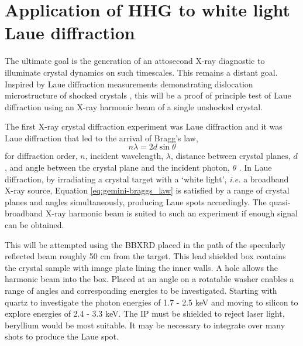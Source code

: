  

\section{Application of HHG to white light Laue diffraction}
The ultimate goal is the generation of an attosecond X-ray diagnostic to illuminate crystal dynamics on such timescales. This remains a distant goal. Inspired by Laue diffraction measurements demonstrating dislocation microstructure of shocked crystals \cite{suggitNanosecondWhitelightLaue2012}, this will be a proof of principle test of Laue diffraction using an X-ray harmonic beam of a single unshocked crystal.

The first X-ray crystal diffraction experiment was Laue diffraction and it was Laue diffraction that led to the arrival of Bragg's law,
\begin{equation}\label{eq:gemini-braggs_law}
	n\lambda = 2d\sin\theta
\end{equation}
for diffraction order, $n$, incident wavelength, $\lambda$, distance between crystal planes, $d$, and angle between the crystal plane and the incident photon, $\theta$ \cite{braggDiffractionWaves1915}. In Laue diffraction, by irradiating a crystal target with a `white light', \textit{i.e. } a broadband X-ray source, Equation \ref{eq:gemini-braggs_law} is satisfied by a range of crystal planes and angles simultaneously, producing Laue spots accordingly. The quasi-broadband X-ray harmonic beam is suited to such an experiment if enough signal can be obtained.

This will be attempted using the \ac{BBXRD} placed in the path of the specularly reflected beam roughly 50 cm from the target. This lead shielded box contains the crystal sample with image plate lining the inner walls. A hole allows the harmonic beam into the box. Placed at an angle on a rotatable washer enables a range of angles and corresponding energies to be investigated. Starting with quartz to investigate the photon energies of 1.7 - 2.5 keV and moving to silicon to explore energies of 2.4 - 3.3 keV. The IP must be shielded to reject laser light, beryllium would be most suitable. It may be necessary to integrate over many shots to produce the Laue spot.

